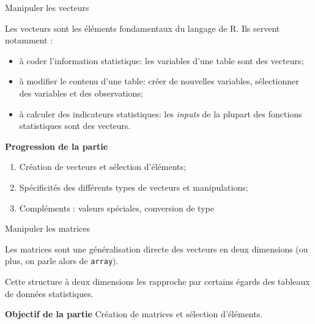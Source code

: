 \documentclass[12pt,ignorenonframetext,]{beamer}
\providecommand{\tightlist}{%
  \setlength{\itemsep}{0pt}\setlength{\parskip}{0pt}}
\newcommand{\strong}[1]{\textbf{\textcolor{redInsee}{#1}}}
\begin{document}
\begin{frame}{Manipuler les vecteurs}

Les vecteurs sont les éléments fondamentaux du langage de R. Ils servent
notamment :

\begin{itemize}
\tightlist
\item
  à coder l'information statistique: les variables d'une table sont des
  vecteurs;
\item
  à modifier le contenu d'une table: créer de nouvelles variables,
  sélectionner des variables et des observations;
\item
  à calculer des indicateurs statistiques: les \emph{inputs} de la
  plupart des fonctions statistiques sont des vecteurs.
\end{itemize}

\pause \bigskip \strong{Progression de la partie}

\begin{enumerate}
\def\labelenumi{\arabic{enumi}.}
\tightlist
\item
  Création de vecteurs et sélection d'éléments;
\item
  Spécificités des différents types de vecteurs et manipulations;
\item
  Compléments : valeurs spéciales, conversion de type
\end{enumerate}

\end{frame}

\begin{frame}[fragile]{Manipuler les matrices}

Les matrices sont une généralisation directe des vecteurs en deux
dimensions (ou plus, on parle alors de \texttt{array}).

\pause Cette structure à deux dimensions les rapproche par certains
égards des tableaux de données statistiques.

\pause \bigskip \strong{Objectif de la partie} Création de matrices et
sélection d'éléments.

\end{frame}
\end{document}
